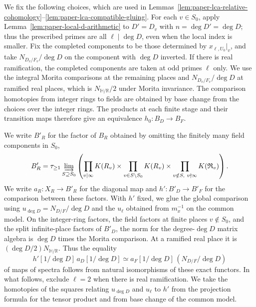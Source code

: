 We fix the following choices, which are used in Lemmas~\ref{lem:paper-lca-relative-cohomology}--\ref{lem:paper-lca-compatible-gluing}.
For each $v\in S_0$, apply Lemma~\ref{lem:paper-local-d-arithmetic} to $D'=D_v$ with $n=\deg D'=\deg D$; thus the prescribed primes are all $\ell\mid\deg D$, even when the local index is smaller.
Fix the completed components to be those determined by $x_{\ell,U_0}|_v$, and take $N_{D_v/F_v}/\deg D$ on the component with $\deg D$ inverted.
If there is real ramification, the completed components are taken at odd primes $\ell$ only.
We use the integral Morita comparisons at the remaining places and $N_{D_v/F_v}/\deg D$ at ramified real places, which is $N_{\mathbb H/\mathbb R}/2$ under Morita invariance.
The comparison homotopies from integer rings to fields are obtained by base change from the choices over the integer rings.
The products at each finite stage and their transition maps therefore give an equivalence $h_0\colon B_D\to B_F$.

We write $B'_R$ for the factor of $B_R$ obtained by omitting the finitely many field components in $S_0$,
\[
 B'_R=\tau_{\ge1}\varinjlim_{S\supseteq S_0}\left(
 \prod_{v\mid\infty}K(R_v)\times\prod_{v\in S\setminus S_0}K(R_v)
 \times\prod_{v\notin S,\ v\nmid\infty}K(\mathfrak R_v)\right).
\]
We write $a_R\colon X_R\to B'_R$ for the diagonal map and $h'\colon B'_D\to B'_F$ for the comparison between these factors.
With $h'$ fixed, we glue the global comparison using $u_{\deg D}=N_{D/F}/\deg D$ and the $u_\ell$ obtained from $m_x^{-1}$ on the common model.
On the integer-ring factors, the field factors at finite places $v\notin S_0$, and the split infinite-place factors of $B'_D$, the norm for the degree-$\deg D$ matrix algebra is $\deg D$ times the Morita comparison.
At a ramified real place it is $(\deg D/2)N_{\mathbb H/\mathbb R}$.
Thus the equality
\[
 h'[1/\deg D]\,a_D[1/\deg D]\simeq a_F[1/\deg D]\,(N_{D/F}/\deg D)
\]
of maps of spectra follows from natural isomorphisms of these exact functors.
In what follows, exclude $\ell=2$ when there is real ramification.
We take the homotopies of the squares relating $u_{\deg D}$ and $u_\ell$ to $h'$ from the projection formula for the tensor product and from base change of the common model.

